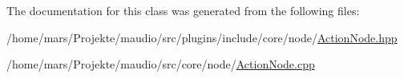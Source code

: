 The documentation for this class was generated from the following files\-:\begin{DoxyCompactItemize}
\item 
/home/mars/\-Projekte/maudio/src/plugins/include/core/node/\hyperlink{ActionNode_8hpp}{Action\-Node.\-hpp}\item 
/home/mars/\-Projekte/maudio/src/core/node/\hyperlink{core_2node_2ActionNode_8cpp}{Action\-Node.\-cpp}\end{DoxyCompactItemize}
